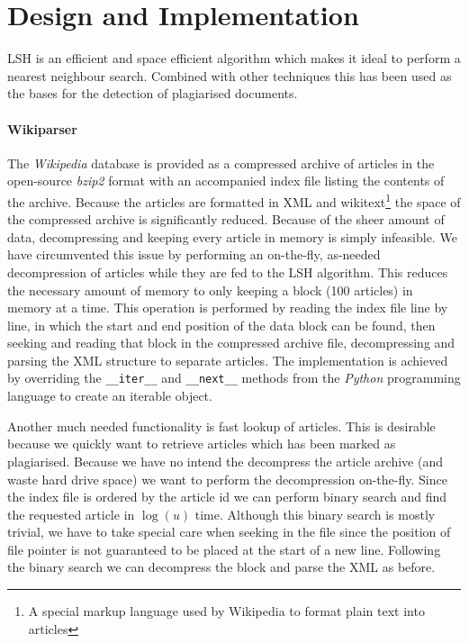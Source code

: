 \section{Design and Implementation}
LSH is an efficient and space efficient algorithm which makes it ideal to perform a nearest neighbour search. Combined with other techniques this has been used as the bases for the detection of plagiarised documents.

\paragraph{Wikiparser}
The \emph{Wikipedia} database is provided as a compressed archive of articles in the open-source \emph{bzip2} format with an accompanied index file listing the contents of the archive. Because the articles are formatted in XML and wikitext\footnote{A special markup language used by Wikipedia to format plain text into articles} the space of the compressed archive is significantly reduced. Because of the sheer amount of data, decompressing and keeping every article in memory is simply infeasible. We have circumvented this issue by performing an on-the-fly, as-needed decompression of articles while they are fed to the LSH algorithm. This reduces the necessary amount of memory to only keeping a block (100 articles) in memory at a time. This operation is performed by reading the index file line by line, in which the start and end position of the data block can be found, then seeking and reading that block in the compressed archive file, decompressing and parsing the XML structure to separate articles. The implementation is achieved by overriding the \texttt{\_\_iter\_\_} and \texttt{\_\_next\_\_} methods from the \emph{Python} programming language to create an iterable object.

Another much needed functionality is fast lookup of articles. This is desirable because we quickly want to retrieve articles which has been marked as plagiarised. Because we have no intend the decompress the article archive (and waste hard drive space) we want to perform the decompression on-the-fly. Since the index file is ordered by the article id we can perform binary search and find the requested article in $\log(u)$ time. Although this binary search is mostly trivial, we have to take special care when seeking in the file since the position of file pointer is not guaranteed to be placed at the start of a new line. Following the binary search we can decompress the block and parse the XML as before.

